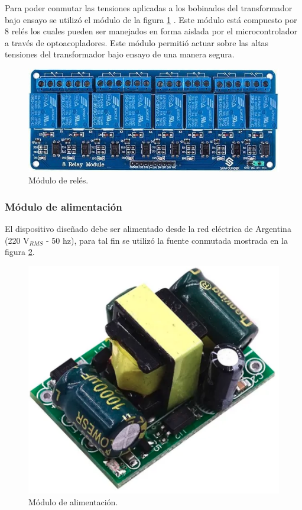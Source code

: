 Para poder conmutar las tensiones aplicadas a los bobinados del transformador bajo ensayo se utilizó el módulo de la figura \ref{fig:reles} . Este módulo está compuesto por 8 relés los cuales pueden ser manejados en forma aislada por el microcontrolador a través de optoacopladores. Este módulo permitió actuar sobre las altas tensiones del transformador bajo ensayo de una manera segura.

\begin{figure}[htpb]
	\centering
	\includegraphics[scale=0.7]{./Figures/reles.jpeg}
	\caption{Módulo de relés.}
	\label{fig:reles}
\end{figure}

\pagebreak

\subsubsection{Módulo de alimentación}
\label{subsubsec:ModAlim}

El dispositivo diseñado debe ser alimentado desde la red eléctrica de Argentina (220 V$_{RMS}$ - 50 hz), para tal fin se utilizó la fuente conmutada mostrada en la figura \ref{fig:fte}.

\begin{figure}[htpb]
	\centering
	\includegraphics[scale=0.6]{./Figures/fte.png}
	\caption{Módulo de alimentación.}
	\label{fig:fte}
\end{figure}

